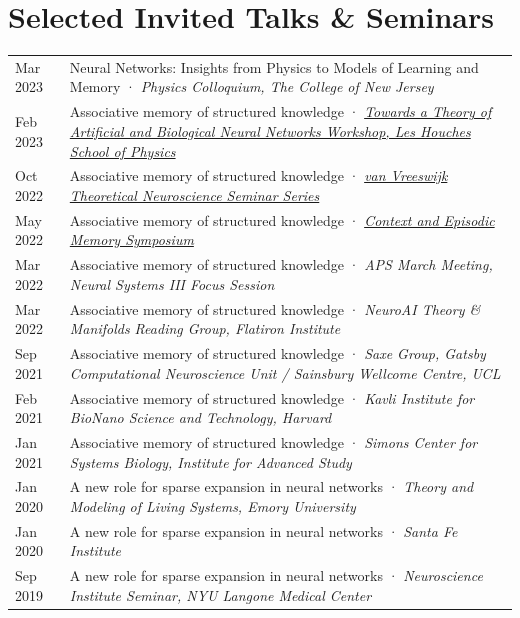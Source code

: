 \documentclass[11pt, letterpaper]{article}
\begin{document}
\section{Selected Invited Talks \& Seminars}
\vspace{-\parskip}
\begin{longtable}{@{}lp{5.2in}@{}}
  \textcolor{midgray}{Mar 2023} &
    Neural Networks: Insights from Physics to Models of Learning and Memory
    · \textit{Physics Colloquium, The College of New Jersey} \\[3pt]
  \textcolor{midgray}{Feb 2023} & Associative memory of structured knowledge
    · \href{https://statphysneuro.github.io}{\textit{Towards a Theory of Artificial and Biological Neural Networks Workshop, Les Houches School of Physics}} \\[3pt]
  \textcolor{midgray}{Oct 2022} &
    Associative memory of structured knowledge
    · \href{https://www.youtube.com/watch?v=rh_-Vh9CGbg}{\textit{van Vreeswijk Theoretical Neuroscience Seminar Series}} \\[3pt]
  \textcolor{midgray}{May 2022} &
    Associative memory of structured knowledge
    · \href{https://memory.psych.upenn.edu/CEMS_2022}{\textit{Context and Episodic Memory Symposium}} \\[3pt]
  \textcolor{midgray}{Mar 2022} &
    Associative memory of structured knowledge
    · \textit{APS March Meeting, Neural Systems III Focus Session} \\[3pt]
  \textcolor{midgray}{Mar 2022} &
    Associative memory of structured knowledge
    · \textit{NeuroAI Theory \& Manifolds Reading Group, Flatiron Institute} \\[3pt]
  \textcolor{midgray}{Sep 2021} &
    Associative memory of structured knowledge
    · \textit{Saxe Group, Gatsby Computational Neuroscience Unit /
    Sainsbury Wellcome Centre, UCL} \\[3pt]
  \textcolor{midgray}{Feb 2021} &
    Associative memory of structured knowledge
    · \textit{Kavli Institute for BioNano Science and Technology, Harvard} \\[3pt]
  \textcolor{midgray}{Jan 2021} &
    Associative memory of structured knowledge
    · \textit{Simons Center for Systems Biology, Institute for Advanced Study} \\[3pt]
  \textcolor{midgray}{Jan 2020} &
    A new role for sparse expansion in neural networks
    · \textit{Theory and Modeling of Living Systems, Emory University} \\[3pt]
  \textcolor{midgray}{Jan 2020} &
    A new role for sparse expansion in neural networks
    · \textit{Santa Fe Institute} \\[3pt]
  \textcolor{midgray}{Sep 2019} &
    A new role for sparse expansion in neural networks
    · \textit{Neuroscience Institute Seminar, NYU Langone Medical Center} \\
\end{longtable}
\end{document}
